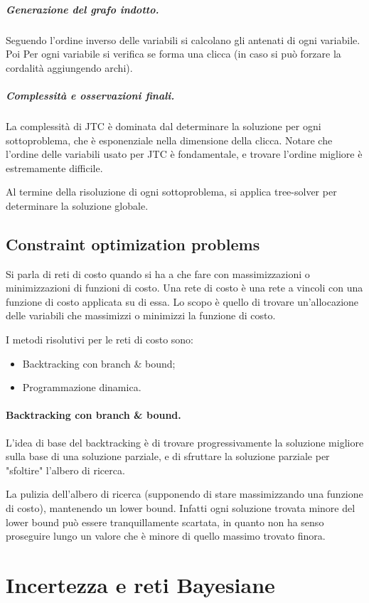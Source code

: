 \documentclass[a4paper, 11pt]{article}
\begin{document}
\subparagraph{Generazione del grafo indotto.} Seguendo l'ordine inverso delle variabili si calcolano gli antenati di ogni variabile. Poi Per ogni variabile si verifica se forma una clicca (in caso si può forzare la cordalità aggiungendo archi).

\subparagraph{Complessità e osservazioni finali.} La complessità di JTC è dominata dal determinare la soluzione per ogni sottoproblema, che è esponenziale nella dimensione della clicca. Notare che l'ordine delle variabili usato per JTC è fondamentale, e trovare l'ordine migliore è estremamente difficile.

Al termine della risoluzione di ogni sottoproblema, si applica tree-solver per determinare la soluzione globale.

\subsection{Constraint optimization problems}
Si parla di reti di costo quando si ha a che fare con massimizzazioni o minimizzazioni di funzioni di costo. Una rete di costo è una rete a vincoli con una funzione di costo applicata su di essa. Lo scopo è quello di trovare un'allocazione delle variabili che massimizzi o minimizzi la funzione di costo.

I metodi risolutivi per le reti di costo sono: \begin{itemize}
	\item Backtracking con branch \& bound;
	\item Programmazione dinamica.
\end{itemize}

\paragraph{Backtracking con branch \& bound.} L'idea di base del backtracking è di trovare progressivamente la soluzione migliore sulla base di una soluzione parziale, e di sfruttare la soluzione parziale per "sfoltire" l'albero di ricerca.

La pulizia dell'albero di ricerca (supponendo di stare massimizzando una funzione di costo), mantenendo un lower bound. Infatti ogni soluzione trovata minore del lower bound può essere tranquillamente scartata, in quanto non ha senso proseguire lungo un valore che è minore di quello massimo trovato finora.

\newpage
\section{Incertezza e reti Bayesiane}
\end{document}
